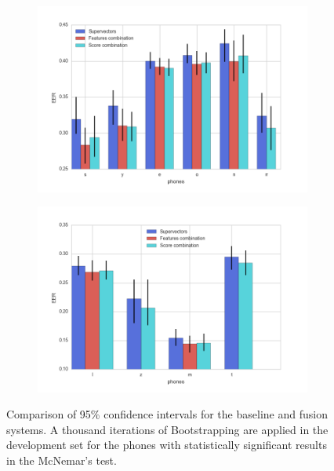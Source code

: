 \begin{figure}[H]
  \centering
  \begin{subfigure}{.47\textwidth}
    \centering
    \captionsetup{width=.95\linewidth}
    \includegraphics[width=.95\linewidth]{files/figures/results/bootstrapping/bootstrapping_dev_2}
  \end{subfigure}
  \begin{subfigure}{.47\textwidth}
    \centering
    \captionsetup{width=.95\linewidth}
    \includegraphics[width=.95\linewidth]{files/figures/results/bootstrapping/bootstrapping_dev_1}
  \end{subfigure}
  \caption{Comparison of 95\% confidence intervals for the baseline and fusion systems.
  A thousand iterations of Bootstrapping are applied
  in the development set for the phones with statistically significant results in the
  McNemar's test.}
  \label{fig:bootstrappingDev}
\end{figure}

